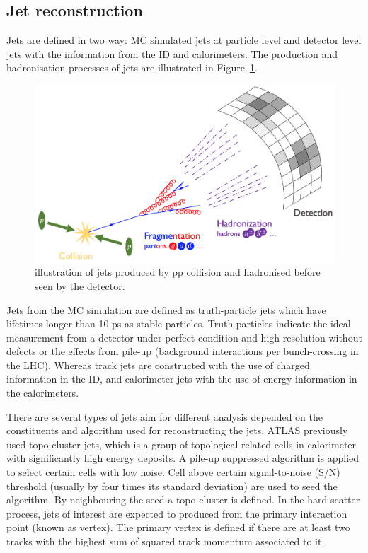 \subsection{Jet reconstruction}
\label{sec:4.1}

Jets are defined in two way:  MC simulated jets at particle level and detector level jets with the information from the ID and calorimeters. The production and hadronisation processes of jets are illustrated in Figure~\ref{Fig.jet}.

\begin{figure}[htb] 
	\centering  
	\includegraphics[width=15cm]{./fig/jet.jpg}	\caption{illustration of jets produced by pp collision and hadronised before seen by the detector.}
	\label{Fig.jet}
\end{figure}

Jets from the MC simulation are defined as truth-particle jets which have lifetimes longer than 10 ps as stable particles. Truth-particles indicate the ideal measurement from a detector under perfect-condition and high resolution without defects or the effects from pile-up (background interactions per bunch-crossing in the LHC). Whereas track jets are constructed with the use of charged information in the ID, and calorimeter jets with the use of energy information in the calorimeters.

There are several types of jets aim for different analysis depended on the constituents and algorithm used for reconstructing the jets. ATLAS previously used topo-cluster jets, which is a group of topological related cells in calorimeter with significantly high energy deposits. A pile-up suppressed algorithm is applied to select certain cells with low noise. Cell above certain signal-to-noise (S/N) threshold (usually by four times its standard deviation) are used to seed the algorithm. By neighbouring the seed a topo-cluster is defined. In the hard-scatter process, jets of interest are expected to produced from the primary interaction point (known as vertex). The primary vertex is defined if there are at least two tracks with the highest sum of squared track momentum associated to it.

